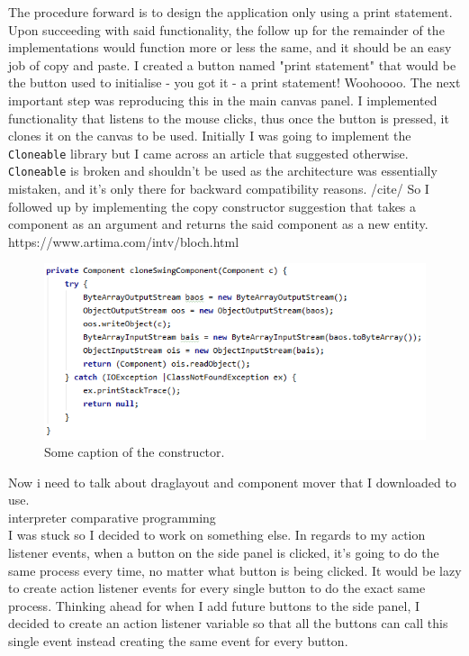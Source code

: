 \documentclass[a4paper, 12pt]{article}
\begin{document}
    The procedure forward is to design the application only using a print statement. Upon
    succeeding with said functionality, the follow up for the remainder of the implementations
    would function more or less the same, and it should be an easy job of copy and paste.
    I created a button named "print statement" that would be the button used to initialise
    - you got it - a print statement! Woohoooo. The next important step was reproducing this
    in the main canvas panel. I implemented functionality that listens to the mouse clicks,
    thus once the button is pressed, it clones it on the canvas to be used. Initially I was
    going to implement the \texttt{Cloneable} library but I came across an article that suggested
    otherwise. \texttt{Cloneable} is broken and shouldn't be used as the architecture was
    essentially mistaken, and it's only there for backward compatibility reasons. /cite/ So
    I followed up by implementing the copy constructor suggestion that takes a component
    as an argument and returns the said component as a new entity.
    https://www.artima.com/intv/bloch.html \\

    \begin{figure}[h]
        \centering
        \includegraphics{copy_constructor.png}
        \caption{Some caption of the constructor.}
    \end{figure}

    Now i need to talk about draglayout and component mover that I downloaded to use. \\


    interpreter comparative programming \\

    I was stuck so I decided to work on something else. In regards to my action listener events,
    when a button on the side panel is clicked, it's going to do the same process every time,
    no matter what button is being clicked. It would be lazy to create action listener events
    for every single button to do the exact same process. Thinking ahead for when I add future
    buttons to the side panel, I decided to create an action listener variable so that all the
    buttons can call this single event instead creating the same event for every button. \\
\end{document}
